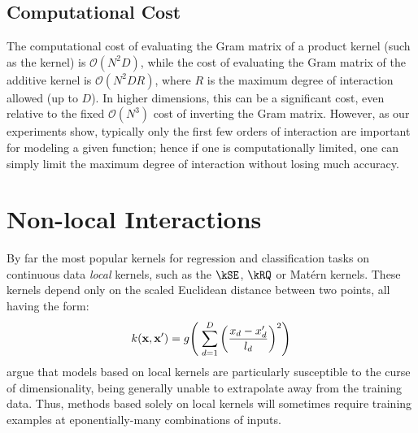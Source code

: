 

\subsection{Computational Cost}
The computational cost of evaluating the Gram matrix of a product kernel (such as the \kSE{} kernel) is $\mathcal{O}(N^2D)$, while the cost of evaluating the Gram matrix of the additive kernel is $\mathcal{O}(N^2DR)$, where $R$ is the maximum degree of interaction allowed (up to $D$).
In higher dimensions, this can be a significant cost, even relative to the fixed $\mathcal{O}(N^3)$ cost of inverting the Gram matrix.
However, as our experiments show, typically only the first few orders of interaction are important for modeling a given function; hence if one is computationally limited, one can simply limit the maximum degree of interaction without losing much accuracy.



\section{Non-local Interactions}
%
By far the most popular kernels for regression and classification tasks on continuous data \emph{local} kernels, such as the $\kSE$, $\kRQ$ or Mat\'{e}rn kernels.
These kernels depend only on the scaled Euclidean distance between two points, all having the form:
\begin{align}
k({\bf x, x'}) = g \!\left( \; \sum_{d=1}^D \left( \frac{  x_{d} - x_{d}' }{ l_d } \right)^2 \right)
\end{align}
\citet{bengio2006curse} argue that models based on local kernels are particularly susceptible to the curse of dimensionality, being generally unable to extrapolate away from the training data.
Thus, methods based solely on local kernels will sometimes require training examples at eponentially-many combinations of inputs.

